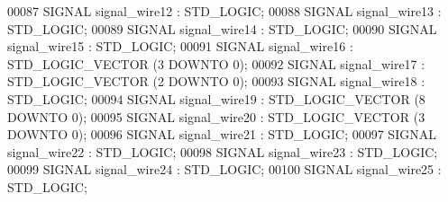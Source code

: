 \begin{DoxyCode}
{00087     \textcolor{keywordflow}{SIGNAL} \textcolor{vhdlchar}{signal_wire12}    \textcolor{vhdlchar}{:}  \textcolor{comment}{STD\_LOGIC};
00088     \textcolor{keywordflow}{SIGNAL} \textcolor{vhdlchar}{signal_wire13}    \textcolor{vhdlchar}{:}  \textcolor{comment}{STD\_LOGIC};
00089     \textcolor{keywordflow}{SIGNAL} \textcolor{vhdlchar}{signal_wire14}    \textcolor{vhdlchar}{:}  \textcolor{comment}{STD\_LOGIC};
00090     \textcolor{keywordflow}{SIGNAL} \textcolor{vhdlchar}{signal_wire15}    \textcolor{vhdlchar}{:}  \textcolor{comment}{STD\_LOGIC};
00091     \textcolor{keywordflow}{SIGNAL} \textcolor{vhdlchar}{signal_wire16}    \textcolor{vhdlchar}{:}  \textcolor{comment}{STD\_LOGIC\_VECTOR} \textcolor{vhdlchar}{(}\textcolor{vhdllogic}{}\textcolor{vhdllogic}{3} \textcolor{keywordflow}{DOWNTO} \textcolor{vhdllogic}{}\textcolor{vhdllogic}{0}\textcolor{vhdlchar}{)};
00092     \textcolor{keywordflow}{SIGNAL} \textcolor{vhdlchar}{signal_wire17}    \textcolor{vhdlchar}{:}  \textcolor{comment}{STD\_LOGIC\_VECTOR} \textcolor{vhdlchar}{(}\textcolor{vhdllogic}{}\textcolor{vhdllogic}{2} \textcolor{keywordflow}{DOWNTO} \textcolor{vhdllogic}{}\textcolor{vhdllogic}{0}\textcolor{vhdlchar}{)};
00093     \textcolor{keywordflow}{SIGNAL} \textcolor{vhdlchar}{signal_wire18}    \textcolor{vhdlchar}{:}  \textcolor{comment}{STD\_LOGIC};
00094     \textcolor{keywordflow}{SIGNAL} \textcolor{vhdlchar}{signal_wire19}    \textcolor{vhdlchar}{:}  \textcolor{comment}{STD\_LOGIC\_VECTOR} \textcolor{vhdlchar}{(}\textcolor{vhdllogic}{}\textcolor{vhdllogic}{8} \textcolor{keywordflow}{DOWNTO} \textcolor{vhdllogic}{}\textcolor{vhdllogic}{0}\textcolor{vhdlchar}{)};
00095     \textcolor{keywordflow}{SIGNAL} \textcolor{vhdlchar}{signal_wire20}    \textcolor{vhdlchar}{:}  \textcolor{comment}{STD\_LOGIC\_VECTOR} \textcolor{vhdlchar}{(}\textcolor{vhdllogic}{}\textcolor{vhdllogic}{3} \textcolor{keywordflow}{DOWNTO} \textcolor{vhdllogic}{}\textcolor{vhdllogic}{0}\textcolor{vhdlchar}{)};
00096     \textcolor{keywordflow}{SIGNAL} \textcolor{vhdlchar}{signal_wire21}    \textcolor{vhdlchar}{:}  \textcolor{comment}{STD\_LOGIC};
00097     \textcolor{keywordflow}{SIGNAL} \textcolor{vhdlchar}{signal_wire22}    \textcolor{vhdlchar}{:}  \textcolor{comment}{STD\_LOGIC};
00098     \textcolor{keywordflow}{SIGNAL} \textcolor{vhdlchar}{signal_wire23}    \textcolor{vhdlchar}{:}  \textcolor{comment}{STD\_LOGIC};
00099     \textcolor{keywordflow}{SIGNAL} \textcolor{vhdlchar}{signal_wire24}    \textcolor{vhdlchar}{:}  \textcolor{comment}{STD\_LOGIC};
00100     \textcolor{keywordflow}{SIGNAL} \textcolor{vhdlchar}{signal_wire25}    \textcolor{vhdlchar}{:}  \textcolor{comment}{STD\_LOGIC};
}
\end{DoxyCode}
